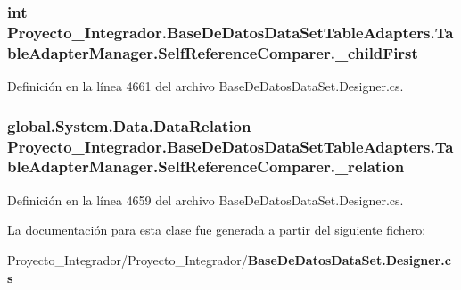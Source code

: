 \subsubsection[{\-\_\-child\-First}]{\setlength{\rightskip}{0pt plus 5cm}int Proyecto\-\_\-\-Integrador.\-Base\-De\-Datos\-Data\-Set\-Table\-Adapters.\-Table\-Adapter\-Manager.\-Self\-Reference\-Comparer.\-\_\-child\-First\hspace{0.3cm}{\ttfamily [private]}}\label{class_proyecto___integrador_1_1_base_de_datos_data_set_table_adapters_1_1_table_adapter_manager_1_1_self_reference_comparer_a8332b2ea97c457b82cc83d09d5378f3a}


Definición en la línea 4661 del archivo Base\-De\-Datos\-Data\-Set.\-Designer.\-cs.

\subsubsection[{\-\_\-relation}]{\setlength{\rightskip}{0pt plus 5cm}global.\-System.\-Data.\-Data\-Relation Proyecto\-\_\-\-Integrador.\-Base\-De\-Datos\-Data\-Set\-Table\-Adapters.\-Table\-Adapter\-Manager.\-Self\-Reference\-Comparer.\-\_\-relation\hspace{0.3cm}{\ttfamily [private]}}\label{class_proyecto___integrador_1_1_base_de_datos_data_set_table_adapters_1_1_table_adapter_manager_1_1_self_reference_comparer_ac16b47b1c7e04fdaa9748000570ac9c7}


Definición en la línea 4659 del archivo Base\-De\-Datos\-Data\-Set.\-Designer.\-cs.



La documentación para esta clase fue generada a partir del siguiente fichero\-:\begin{DoxyCompactItemize}
\item 
Proyecto\-\_\-\-Integrador/\-Proyecto\-\_\-\-Integrador/{\bf Base\-De\-Datos\-Data\-Set.\-Designer.\-cs}\end{DoxyCompactItemize}
